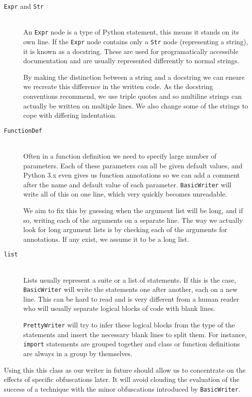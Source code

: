 \documentclass[twoside,a4paper]{report}
\begin{document}
\begin{description}
\item[\texttt{Expr} and \texttt{Str}] \hfill \\
An \texttt{Expr} node is a type of Python statement, this means it stands on its own line. If the \texttt{Expr} node contains only a \texttt{Str} node
(representing a string), it is known as a docstring. These are used for programatically accessible documentation and are usually represented
differently to normal strings.

By making the distinction between a string and a docstring we can ensure we recreate this difference in the written code. As the docstring conventions 
\cite{docstr} recommend, we use triple quotes and so multiline strings can actually be written on multiple lines. We also change some of the strings to
cope with differing indentation.

\item[\texttt{FunctionDef}] \hfill \\
Often in a function definition we need to specify large number of parameters. Each of these parameters can all be given default values, and Python 3.x
even gives us function annotations so we can add a comment after the name and default value of each parameter. \texttt{BasicWriter} will write all
of this on one line, which very quickly becomes unreadable.

We aim to fix this by guessing when the argument list will be long, and if so, writing each of the arguments on a separate line. The way we actually look
for long argument lists is by checking each of the arguments for annotations. If any exist, we assume it to be a long list.

\item[\texttt{list}] \hfill \\
Lists usually represent a suite or a list of statements. If this is the case, \texttt{BasicWriter} will write the statements one after another, each on a
new line. This can be hard to read and is very different from a human reader who will usually separate logical blocks of code with blank lines.

\texttt{PrettyWriter} will try to infer these logical blocks from the type of the statements and insert the necessary blank lines to split them. For instance,
\texttt{import} statements are grouped together and class or function definitions are always in a group by themselves.
\end{description}

Using this this class as our writer in future should allow us to concentrate on the effects of specific obfuscations later. It will avoid clouding the evaluation
of the success of a technique with the minor obfuscations introduced by \texttt{BasicWriter}.
\end{document}

